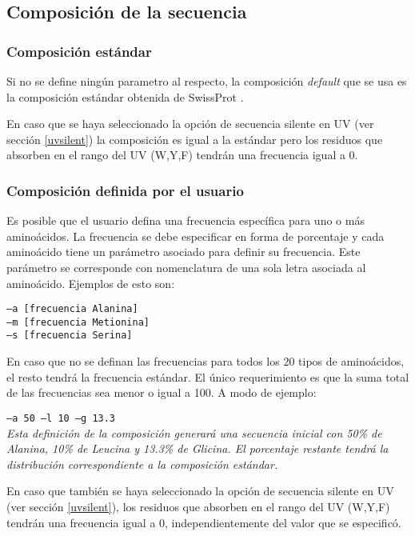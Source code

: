 \subsection{Composición de la secuencia} \label{composicion}

\subsubsection{Composición estándar}
Si no se define ningún parametro al respecto, la composición \textit{default} que se usa es la composición estándar obtenida de SwissProt \cite{compositionAA}.  

En caso que se haya seleccionado la opción de secuencia silente en UV (ver sección \ref{uvsilent}) la composición es igual a la estándar pero los residuos que absorben en el rango del UV (W,Y,F) tendrán una frecuencia igual a 0.

\subsubsection{Composición definida por el usuario}

Es posible que el usuario defina una frecuencia específica para uno o más aminoácidos. 
La frecuencia se debe especificar en forma de porcentaje y cada aminoácido tiene un parámetro asociado para definir su frecuencia. 
Este parámetro se corresponde con nomenclatura de una sola letra asociada al aminoácido. Ejemplos de esto son:

\indent \texttt{--a  [frecuencia Alanina]} \\
\indent \texttt{--m  [frecuencia Metionina]} \\
\indent \texttt{--s  [frecuencia Serina]} 

En caso que no se definan las frecuencias para todos los 20 tipos de aminoácidos, el resto tendrá la frecuencia estándar. El único requerimiento es que la suma total de las frecuencias sea menor o igual a 100.
A modo de ejemplo:

\indent \texttt{--a 50 --l 10 --g 13.3 } \\
\textit{Esta definición de la composición generará una secuencia inicial con 50\% de Alanina, 10\% de Leucina y 13.3\% de Glicina. 
El porcentaje restante tendrá la distribución correspondiente a la composición estándar.}



En caso que también se haya seleccionado la opción de secuencia silente en UV (ver sección \ref{uvsilent}), los residuos que absorben en el rango del UV (W,Y,F) tendrán una frecuencia igual a 0, independientemente del valor que se especificó.

